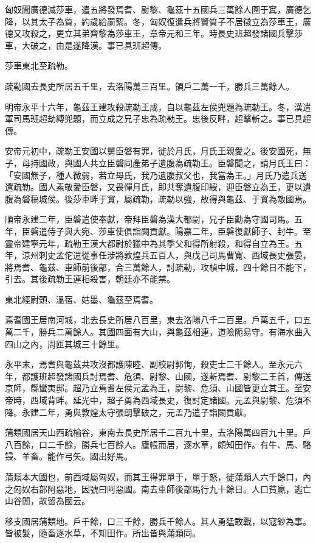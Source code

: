 \begin{pinyinscope}
匈奴聞廣德滅莎車，遣五將發焉耆、尉黎、龜茲十五國兵三萬餘人圍于窴，廣德乞降，以其太子為質，約歲給罽絮。冬，匈奴復遣兵將賢質子不居徵立為莎車王，廣德又攻殺之，更立其弟齊黎為莎車王，章帝元和三年。時長史班超發諸國兵擊莎車，大破之，由是遂降漢。事已具班超傳。

莎車東北至疏勒。

疏勒國去長史所居五千里，去洛陽萬三百里。領戶二萬一千，勝兵三萬餘人。

明帝永平十六年，龜茲王建攻殺疏勒王成，自以龜茲左侯兜題為疏勒王。冬，漢遣軍司馬班超劫縛兜題，而立成之兄子忠為疏勒王。忠後反畔，超擊斬之。事已具超傳。

安帝元初中，疏勒王安國以舅臣磐有罪，徙於月氏，月氏王親愛之。後安國死，無子，母持國政，與國人共立臣磐同產弟子遺腹為疏勒王。臣磐聞之，請月氏王曰：「安國無子，種人微弱，若立母氏，我乃遺腹叔父也，我當為王。」月氏乃遣兵送還疏勒。國人素敬愛臣磐，又畏憚月氏，即共奪遺腹印綬，迎臣磐立為王，更以遺腹為磐稿城侯。後莎車畔于窴，屬疏勒，疏勒以強，故得與龜茲、于窴為敵國焉。

順帝永建二年，臣磐遣使奉獻，帝拜臣磐為漢大都尉，兄子臣勳為守國司馬。五年，臣磐遣侍子與大宛、莎車使俱詣闕貢獻。陽嘉二年，臣磐復獻師子、封牛。至靈帝建寧元年，疏勒王漢大都尉於獵中為其季父和得所射殺，和得自立為王。五年，涼州刺史孟佗遣從事任涉將敦煌兵五百人，與戊己司馬曹寬、西域長史張晏，將焉耆、龜茲、車師前後部，合三萬餘人，討疏勒，攻楨中城，四十餘日不能下，引去。其後疏勒王連相殺害，朝廷亦不能禁。

東北經尉頭、溫宿、姑墨、龜茲至焉耆。

焉耆國王居南河城，北去長史所居八百里，東去洛陽八千二百里。戶萬五千，口五萬二千，勝兵二萬餘人。其國四面有大山，與龜茲相連，道險阨易守。有海水曲入四山之內，周匝其城三十餘里。

永平末，焉耆與龜茲共攻沒都護陳睦、副校尉郭恂，殺吏士二千餘人。至永元六年，都護班超發諸國兵討焉耆、危須、尉黎、山國，遂斬焉耆、尉黎二王首，傳送京師，縣蠻夷邸。超乃立焉耆左侯元孟為王，尉黎、危須、山國皆更立其王。至安帝時，西域背畔。延光中，超子勇為西域長史，復討定諸國。元孟與尉黎、危須不降。永建二年，勇與敦煌太守張朗擊破之，元孟乃遣子詣闕貢獻。

蒲類國居天山西疏榆谷，東南去長史所居千二百九十里，去洛陽萬四百九十里。戶八百餘，口二千餘，勝兵七百餘人。廬帳而居，逐水草，頗知田作。有牛、馬、駱锓、羊畜。能作弓矢。國出好馬。

蒲類本大國也，前西域屬匈奴，而其王得罪單于，單于怒，徙蒲類人六千餘口，內之匈奴右部阿惡地，因號曰阿惡國。南去車師後部馬行九十餘日。人口貧羸，逃亡山谷閒，故留為國云。

移支國居蒲類地。戶千餘，口三千餘，勝兵千餘人。其人勇猛敢戰，以寇鈔為事。皆被髮，隨畜逐水草，不知田作。所出皆與蒲類同。


\end{pinyinscope}
